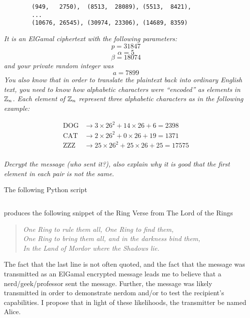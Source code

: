 \documentclass[12pt]{article}
\begin{document}
    \begin{verbatim}
        (949,   2750),  (8513,  28089), (5513,  8421),
        ...
        (10676, 26545), (30974, 23306), (14689, 8359)
    \end{verbatim}

    \textit{It is an ElGamal ciphertext with the following parameters:}
        $$p = 31847$$
        $$\alpha = 5$$
        $$\beta = 18074$$
    \textit{and your private random integer was}
        $$a = 7899$$
    \textit{You also know that in order to translate the plaintext back into ordinary English text, you need to know how alphabetic characters were ``encoded'' as elements in $\mathbb{Z}_n$.  Each element of $\mathbb{Z}_n$ represent three alphabetic characters as in the following example:}

        \begin{align*}
            \text{DOG} &\to 3  \times 26^2 + 14 \times 26 + 6  = 2398\\
            \text{CAT} &\to 2  \times 26^2 + 0  \times 26 + 19 = 1371\\
            \text{ZZZ} &\to 25 \times 26^2 + 25 \times 26 + 25 = 17575\\
        \end{align*}

    \textit{Decrypt the message (who sent it?), also explain why it is good that the first element in each pair is not the same.}

    The following Python script

    \inputminted{python}{scripts/prob_6.py}

    produces the following snippet of the Ring Verse from The Lord of the Rings

    \begin{quote}
        \centering
        \textit{One Ring to rule them all, One Ring to find them,}\\
        \textit{One Ring to bring them all, and in the darkness bind them,}\\
        \textit{In the Land of Mordor where the Shadows lie.}\\
    \end{quote}

    The fact that the last line is not often quoted, and the fact that the message was transmitted as an ElGamal encrypted message leads me to believe that a nerd/geek/professor sent the message. Further, the message was likely transmitted in order to demonstrate nerdom and/or to test the recipient's capabilities. I propose that in light of these likelihoods, the transmitter be named Alice.
\end{document}
